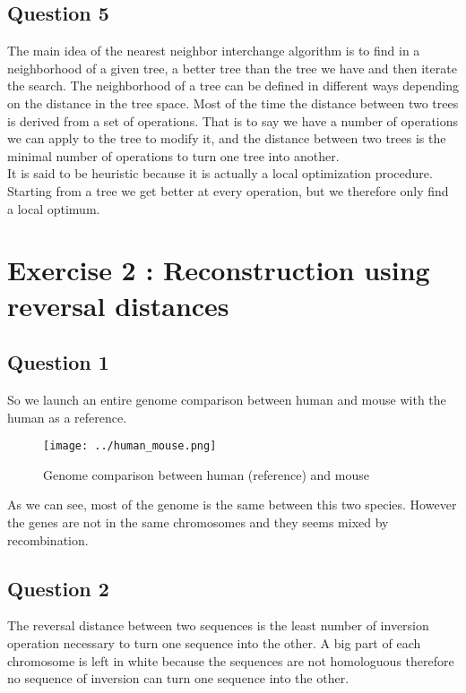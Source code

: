 \documentclass[]{article}
\theoremstyle{definition}
\begin{document}
\subsection{Question 5}
The main idea of the nearest neighbor interchange algorithm is to find in a neighborhood of a given tree, a better tree than the tree we have and then iterate the search. The neighborhood of a tree can be defined in different ways depending on the distance in the tree space. Most of the time the distance between two trees is derived from a set of operations. That is to say we have a number of operations we can apply to the tree to modify it, and the distance between two trees is the minimal number of operations to turn one tree into another.\\
It is said to be heuristic because it is actually a local optimization procedure. Starting from a tree we get better at every operation, but we therefore only find a local optimum.


\newpage 
\section{Exercise 2 : Reconstruction using reversal distances}
\subsection{Question 1}
So we launch an entire genome comparison between human and mouse with the human as a reference.


\begin{figure}[h!]
	\centering
	\texttt{[image: ../human\_mouse.png]}
	\caption{\label{h_m} Genome comparison between human (reference) and mouse }
\end{figure}

As we can see, most of the genome is the same between this two species. However the genes are not in the same chromosomes and they seems mixed by recombination.

\subsection{Question 2}

The reversal distance between two sequences is the least number of inversion operation necessary to turn one sequence into the other. A big part of each chromosome is left in white because the sequences are not homologuous therefore no sequence of inversion can turn one sequence into the other. \\
\end{document}
